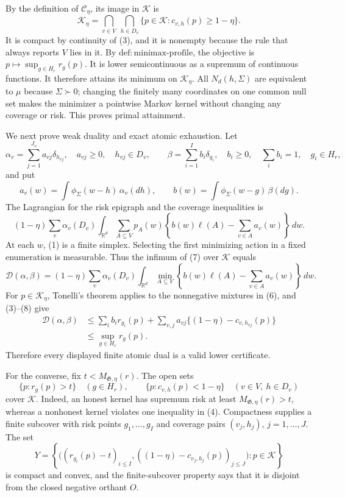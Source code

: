 By the definition of \(\mathcal C_\eta\), its image in \(\mathscr K\) is
\[
 \mathscr K_\eta=
 \bigcap_{v\in V}\ \bigcap_{h\in D_v}
 \{p\in\mathscr K:c_{v,h}(p)\geq1-\eta\}.
\tag{4}
\]
It is compact by continuity of (3), and it is nonempty because the rule that
always reports \(V\) lies in it.  By
\(\mathrm{def:minimax\mbox{-}profile}\), the objective is
\(p\mapsto\sup_{g\in H_r}r_g(p)\).  It is lower semicontinuous as a
supremum of continuous functions.  It therefore attains its minimum on
\(\mathscr K_\eta\).  All \(N_d(h,\Sigma)\) are equivalent to \(\mu\) because
\(\Sigma\succ0\); changing the finitely many coordinates on one common null
set makes the minimizer a pointwise Markov kernel without changing any
coverage or risk.  This proves primal attainment.

We next prove weak duality and exact atomic exhaustion.  Let
\[
 \alpha_v=\sum_{j=1}^{J_v}a_{vj}\delta_{h_{vj}},
 \quad a_{vj}\geq0,\quad h_{vj}\in D_v,
 \qquad
 \beta=\sum_{i=1}^{I}b_i\delta_{g_i},
 \quad b_i\geq0,\quad\sum_i b_i=1,\quad g_i\in H_r,
\tag{5}
\]
and put
\[
 a_v(w)=\int\phi_\Sigma(w-h)\,\alpha_v(dh),
 \qquad
 b(w)=\int\phi_\Sigma(w-g)\,\beta(dg).
\tag{6}
\]
The Lagrangian for the risk epigraph and the coverage inequalities is
\[
 (1-\eta)\sum_v\alpha_v(D_v)
 \int_{\mathbb R^d}\sum_{A\subseteq V}p_A(w)
 \left\{b(w)\ell(A)-\sum_{v\in A}a_v(w)\right\}\,dw .
\tag{7}
\]
At each \(w\), (1) is a finite simplex.  Selecting the first minimizing
action in a fixed enumeration is measurable.  Thus the infimum of (7) over
\(\mathscr K\) equals
\[
 \mathcal D(\alpha,\beta)=
 (1-\eta)\sum_v\alpha_v(D_v)
 \int_{\mathbb R^d}\min_{A\subseteq V}
 \left\{b(w)\ell(A)-\sum_{v\in A}a_v(w)\right\}\,dw .
\tag{8}
\]
For \(p\in\mathscr K_\eta\), Tonelli's theorem applies to the nonnegative
mixtures in (6), and (3)--(8) give
\[
 \begin{aligned}
 \mathcal D(\alpha,\beta)
 &\leq
 \sum_i b_i r_{g_i}(p)
 +\sum_{v,j}a_{vj}\{(1-\eta)-c_{v,h_{vj}}(p)\}\\
 &\leq \sup_{g\in H_r}r_g(p).
 \end{aligned}
\tag{9}
\]
Therefore every displayed finite atomic dual is a valid lower certificate.

For the converse, fix \(t<M_{\mathfrak G,\eta}(r)\).  The open sets
\[
 \{p:r_g(p)>t\}\quad(g\in H_r),\qquad
 \{p:c_{v,h}(p)<1-\eta\}\quad(v\in V,\ h\in D_v)
\tag{10}
\]
cover \(\mathscr K\).  Indeed, an honest kernel has supremum risk at least
\(M_{\mathfrak G,\eta}(r)>t\), whereas a nonhonest kernel violates one
inequality in (4).  Compactness supplies a finite subcover with risk points
\(g_1,\ldots,g_I\) and coverage pairs
\((v_j,h_j)\), \(j=1,\ldots,J\).  The set
\[
 Y=\left\{
 \bigl((r_{g_i}(p)-t)_{i\leq I},
 ((1-\eta)-c_{v_j,h_j}(p))_{j\leq J}\bigr):
 p\in\mathscr K
 \right\}
\tag{11}
\]
is compact and convex, and the finite-subcover property says that it is
disjoint from the closed negative orthant \(O\).

